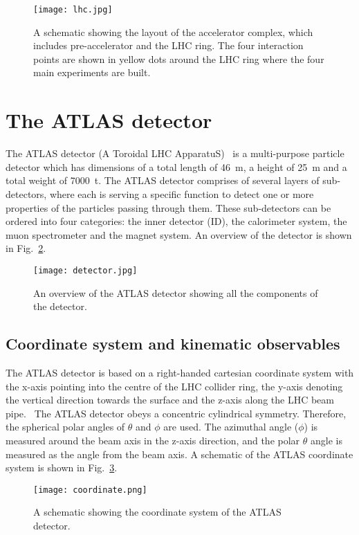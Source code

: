\begin{figure}[hbt!]
	\centering
	\texttt{[image: lhc.jpg]}
	\caption{A schematic showing the layout of the accelerator complex, which includes pre-accelerator and the LHC ring. The four interaction points are shown in yellow dots around the LHC ring where the four main experiments are built.~\cite{lhc_picture}}
	\label{fig:lhcandatlas:lhc}
\end{figure}



\section{The ATLAS detector}%
\label{sec:lhcandatlas:atlas}
The ATLAS detector (A Toroidal LHC ApparatuS)~\cite{atlas} is a multi-purpose particle detector which has dimensions of a total length of \SI{46}{\meter}, a height of \SI{25}{\meter} and a total weight of \SI{7000}{\tonne}. The ATLAS detector comprises of several layers of sub-detectors, where each is serving a specific function to detect one or more properties of the particles passing through them. These sub-detectors can be ordered into four categories: the inner detector (ID), the calorimeter system, the muon spectrometer and the magnet system. An overview of the detector is shown in Fig.\ \ref{fig:lhcandatlas:atlas}.~\cite{detector}
\begin{figure}[hbt!]
	\centering
	\texttt{[image: detector.jpg]}
	\caption{An overview of the ATLAS detector showing all the components of the detector.~\cite{detector}}
	\label{fig:lhcandatlas:atlas}
\end{figure}

\subsection{Coordinate system and kinematic observables}%
\label{sec:lhcandatlas:atlas:observables}
The ATLAS detector is based on a right-handed cartesian coordinate system with the x-axis pointing into the centre of the LHC collider ring, the y-axis denoting the vertical direction towards the surface and the z-axis along the LHC beam pipe.~\cite{detector} The ATLAS detector obeys a concentric cylindrical symmetry. Therefore, the spherical polar angles of $\theta$ and $\phi$ are used. The azimuthal angle ($\phi$) is measured around the beam axis in the z-axis direction, and the polar $\theta$ angle is measured as the angle from the beam axis. A schematic of the ATLAS coordinate system is shown in Fig.\ \ref{fig:lhcandatlas:atlas:observables}.
\begin{figure}[hbt!]
	\centering
	\texttt{[image: coordinate.png]}
	\caption{A schematic showing the coordinate system of the ATLAS detector.~\cite{atlas_coordinate}}
	\label{fig:lhcandatlas:atlas:observables}
\end{figure}
 
